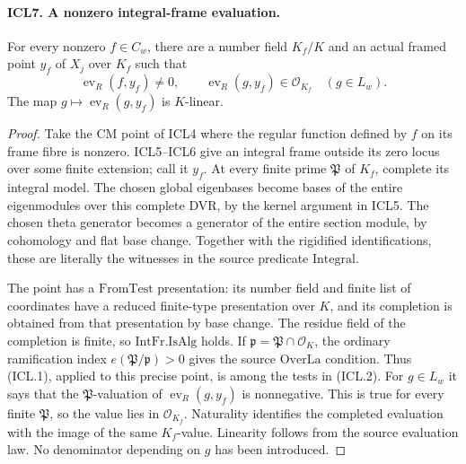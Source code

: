 \paragraph{ICL7. A nonzero integral-frame evaluation.}
\label{claim:ICL7}
For every nonzero \(f\in C_w\), there are a number field
\(K_f/K\) and an actual framed point \(y_f\) of \(X_j\) over
\(K_f\) such that
\[
 \operatorname{ev}_R(f,y_f)\ne0,\qquad
 \operatorname{ev}_R(g,y_f)\in\mathcal O_{K_f}\quad(g\in L_w).
                                                               \tag{ICL.4}
\]
The map \(g\mapsto\operatorname{ev}_R(g,y_f)\) is \(K\)-linear.
\begin{proof}
Take the CM point of ICL4 where the regular function defined
by \(f\) on its frame fibre is nonzero.  ICL5--ICL6 give an
integral frame outside its zero locus over some finite
extension; call it \(y_f\).  At every finite prime
\(\mathfrak P\) of \(K_f\), complete its integral model.
The chosen global eigenbases become bases of the entire
eigenmodules over this complete DVR, by the kernel argument
in ICL5.  The chosen theta generator becomes a generator of
the entire section module, by cohomology and flat base change.
Together with the rigidified identifications, these are
literally the witnesses in the source predicate
\(\mathrm{Integral}\).

The point has a \(\mathrm{FromTest}\) presentation: its
number field and finite list of coordinates have a reduced
finite-type presentation over \(K\), and its completion is
obtained from that presentation by base change.  The residue
field of the completion is finite, so
\(\mathrm{IntFr.IsAlg}\) holds.  If
\(\mathfrak p=\mathfrak P\cap\mathcal O_K\), the ordinary
ramification index \(e(\mathfrak P/\mathfrak p)>0\) gives the
source \(\mathrm{OverLa}\) condition.  Thus (ICL.1), applied
to this precise point, is among the tests in (ICL.2).
For \(g\in L_w\) it says that the \(\mathfrak P\)-valuation
of \(\operatorname{ev}_R(g,y_f)\) is nonnegative.  This is
true for every finite \(\mathfrak P\), so the value lies in
\(\mathcal O_{K_f}\).  Naturality identifies the completed
evaluation with the image of the same \(K_f\)-value.
Linearity follows from the source evaluation law.  No
denominator depending on \(g\) has been introduced.
\end{proof}

